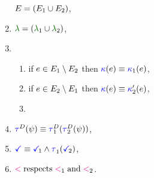 \begin{figure}
\begin{multicols}{2}
\begin{enumerate}[topsep=0pt,label=(\textsc{s}\arabic*),ref=\textsc{s}\arabic*]
      $E = (E_1\cup E_2)$,
    \item \label{seq-lambda}
      ${\labeling}=\PBR{{\labeling_1}\cup {\labeling_2}}$, 
    \item[] 
      \begin{enumerate}[leftmargin=0pt]
      \item \label{seq-kappa1}
        if $e\in E_1\setminus E_2$ then ${\color{blue}\kappa}(e) \mathrel{\equiv} {\color{blue}\kappa}_1(e)$,
      \item \label{seq-kappa2}
        if $e\in E_2\setminus E_1$ then ${\color{blue}\kappa}(e) \mathrel{\equiv} {\color{blue}\kappa}'_2(e)$, %
      \item \label{seq-kappa12}
      \end{enumerate}
      \columnbreak
    \item \label{seq-tau}
      $\aTr{\bEvs}{\bForm} \riff \aTr[1]{\bEvs}{\aTr[2]{\bEvs}{\bForm}}$,
    \item \label{seq-term}
      $\aTerm \riff \aTerm[1]\land\aTr[1]{}{\aTerm[2]}$,
    \item \label{seq-le}
      ${\lt}\rextends{\lt_1}{\lt_2}$.
    \end{enumerate}
  \end{multicols}
  \medskip


\end{figure}
